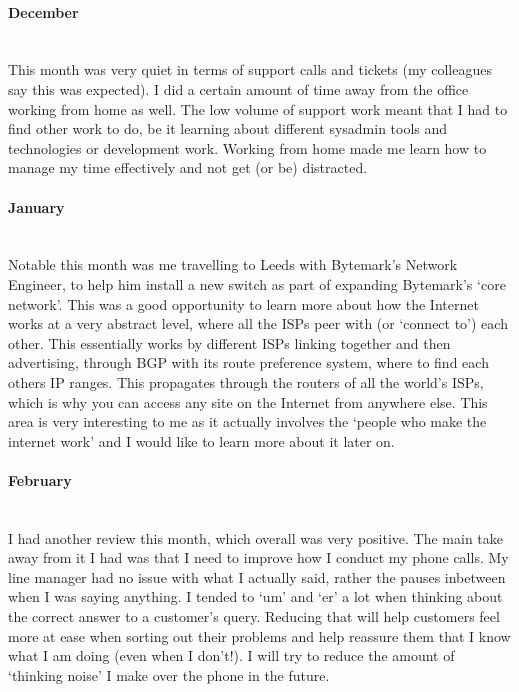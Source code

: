 \documentclass[12pt,a4paper]{article}
\newcommand{\paragraphnl}[1]{\paragraph{#1}\mbox{}\\}
\begin{document}
\paragraphnl{December}
	This month was very quiet in terms of support calls and tickets (my
	colleagues say this was expected). I did a certain amount of time away from
	the office working from home as well. The low volume of support work meant
	that I had to find other work to do, be it learning about different sysadmin
	tools and technologies or development work. Working from home made me learn
	how to manage my time effectively and not get (or be) distracted.

\paragraphnl{January}
	Notable this month was me travelling to Leeds with Bytemark's Network
	Engineer, to help him install a new switch as part of expanding Bytemark's
	`core network'. This was a good opportunity to learn more about how the
	Internet works at a very abstract level, where all the ISPs peer with (or
	`connect to') each other. This essentially works by different ISPs linking
	together and then advertising, through BGP with its route preference system,
	where to find each others IP ranges. This propagates through the routers of
	all the world's ISPs, which is why you can access any site on the Internet
	from anywhere else. This area is very interesting to me as it actually
	involves the `people who make the internet work' and I would like to learn
	more about it later on.

\paragraphnl{February}
	I had another review this month, which overall was very positive. The main
	take away from it I had was that I need to improve how I conduct my phone
	calls. My line manager had no issue with what I actually said, rather the
	pauses inbetween when I was saying anything. I tended to `um' and `er' a lot
	when thinking about the correct answer to a customer's query. Reducing that
	will help customers feel more at ease when sorting out their problems and
	help reassure them that I know what I am doing (even when I don't!). I will
	try to reduce the amount of `thinking noise' I make over the phone in the
	future.
\end{document}

